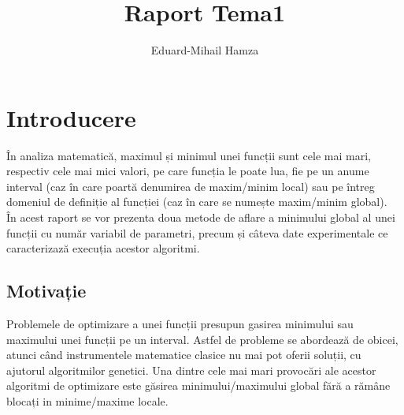 \documentclass{article}
\author{Eduard-Mihail Hamza}
\title{Raport Tema1}
\begin{document}
\maketitle

\section{Introducere}

În analiza matematică, maximul și minimul unei funcții sunt cele mai mari, respectiv cele mai mici valori, pe care funcția le poate lua, fie pe un anume interval (caz în care poartă denumirea de maxim/minim local) sau pe întreg domeniul de definiție al funcției (caz în care se numește maxim/minim global).\\
În acest raport se vor prezenta doua metode de aflare a minimului global al unei funcții cu număr variabil de parametri, precum și câteva date experimentale ce caracterizază execuția acestor algoritmi. 


 
\subsection{Motivație}
Problemele de optimizare a unei funcții presupun gasirea minimului sau maximului unei funcții pe un interval. Astfel de probleme se abordează de obicei, atunci când instrumentele matematice clasice nu mai pot oferii soluții, cu ajutorul algoritmilor genetici. Una dintre cele mai mari provocări ale acestor algoritmi de optimizare este găsirea minimului/maximului global fără a rămâne blocați in minime/maxime locale.
\end{document}
